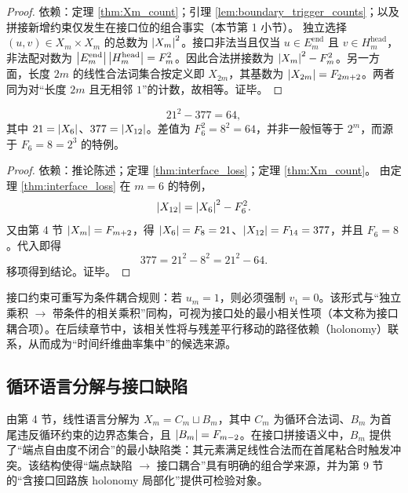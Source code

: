 \begin{proof}
\MathTag 依赖：定理 \ref{thm:Xm_count}；引理 \ref{lem:boundary_trigger_counts}；以及拼接新增约束仅发生在接口位的组合事实（本节第 1 小节）。
独立选择 $(u,v)\in X_m\times X_m$ 的总数为 $\left\lvert X_m\right\rvert^2$。接口非法当且仅当 $u\in E_m^{\mathrm{end}}$ 且 $v\in H_m^{\mathrm{head}}$，非法配对数为 $\left\lvert E_m^{\mathrm{end}}\right\rvert\left\lvert H_m^{\mathrm{head}}\right\rvert=F_m^2$。因此合法拼接数为 $\left\lvert X_m\right\rvert^2-F_m^2$。另一方面，长度 $2m$ 的线性合法词集合按定义即 $X_{2m}$，其基数为 $\left\lvert X_{2m}\right\rvert=F_{2m+2}$。两者同为对“长度 $2m$ 且无相邻 $1$”的计数，故相等。证毕。
\end{proof}

\begin{corollary}[最小核 $m=6$]
$$
21^2-377=64,
$$
其中 $21=\left\lvert X_6\right\rvert$、$377=\left\lvert X_{12}\right\rvert$。差值为 $F_6^2=8^2=64$，并非一般恒等于 $2^m$，而源于 $F_6=8=2^3$ 的特例。
\end{corollary}

\begin{proof}
\MathTag 依赖：推论陈述；定理 \ref{thm:interface_loss}；定理 \ref{thm:Xm_count}。
由定理 \ref{thm:interface_loss} 在 $m=6$ 的特例，
$$
\left\lvert X_{12}\right\rvert=\left\lvert X_6\right\rvert^2-F_6^2.
$$
又由第 4 节 $\left\lvert X_m\right\rvert=F_{m+2}$，得 $\left\lvert X_6\right\rvert=F_8=21$、$\left\lvert X_{12}\right\rvert=F_{14}=377$，并且 $F_6=8$。代入即得
$$
377=21^2-8^2=21^2-64.
$$
移项得到结论。证毕。
\end{proof}

\begin{remark}[条件耦合的等价刻画]
接口约束可重写为条件耦合规则：若 $u_m=1$，则必须强制 $v_1=0$。该形式与“独立乘积 $\to$ 带条件的相关乘积”同构，可视为接口处的最小相关性项（本文称为接口耦合项）。在后续章节中，该相关性将与残差平行移动的路径依赖（holonomy）联系，从而成为“时间纤维曲率集中”的候选来源。
\end{remark}

\subsection{循环语言分解与接口缺陷}

由第 4 节，线性语言分解为 $X_m=C_m\sqcup B_m$，其中 $C_m$ 为循环合法词、$B_m$ 为首尾违反循环约束的边界态集合，且 $\left\lvert B_m\right\rvert=F_{m-2}$。在接口拼接语义中，$B_m$ 提供了“端点自由度不闭合”的最小缺陷类：其元素满足线性合法而在首尾粘合时触发冲突。该结构使得“端点缺陷 $\to$ 接口耦合”具有明确的组合学来源，并为第 9 节的“含接口回路族 holonomy 局部化”提供可检验对象。
